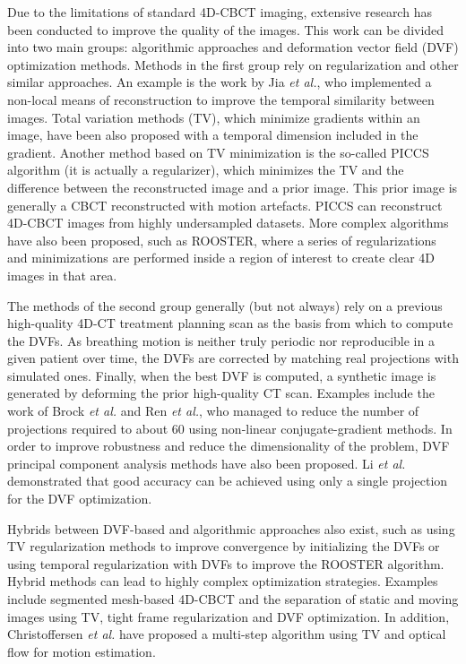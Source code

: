 Due to the limitations of standard 4D-CBCT imaging, extensive research has been conducted to improve the quality of the images.  This work can be divided into two main groups: algorithmic approaches and deformation vector field (DVF) optimization methods.  Methods in the first group rely on regularization and other similar approaches.  An example is the work by Jia \textit{et al.}\cite{jia2012}, who implemented a non-local means of reconstruction to improve the temporal similarity between images.  Total variation methods (TV)\cite{ASD_POCS}, which minimize gradients within an image, have been also proposed with a temporal dimension included in the gradient\cite{0031-9155-57-6-1517}.  Another method based on TV minimization is the so-called PICCS algorithm\cite{chen2008prior}\cite{0031-9155-53-20-006}\cite{chen2012time} (it is actually a regularizer), which minimizes the TV and the difference between the reconstructed image and a prior image.  This prior image is generally a CBCT reconstructed with motion artefacts.  PICCS can reconstruct 4D-CBCT images from highly undersampled datasets.  More complex algorithms have also been proposed, such as ROOSTER\cite{:/content/aapm/journal/medphys/41/2/10.1118/1.4860215}, where a series of regularizations and minimizations are performed inside a region of interest to create clear 4D images in that area.

The methods of the second group generally (but not always) rely on a previous high-quality 4D-CT treatment planning scan as the basis from which to compute the DVFs.  As breathing motion is neither truly periodic nor reproducible in a given patient over time, the DVFs are corrected by matching real projections with simulated ones.  Finally, when the best DVF is computed, a synthetic image is generated by deforming the prior high-quality CT scan.  Examples include the work of Brock \textit{et al.}\cite{brock2010} and Ren \textit{et al.}\cite{Ren20121584}, who managed to reduce the number of projections required to about 60 using non-linear conjugate-gradient methods.  In order to improve robustness and reduce the dimensionality of the problem, DVF principal component analysis methods have also been proposed\cite{zhang2010correction}.  Li \textit{et al.}\cite{:/content/aapm/journal/medphys/37/6/10.1118/1.3426002}\cite{:/content/aapm/journal/medphys/38/5/10.1118/1.3582693} demonstrated that good accuracy can be achieved using only a single projection for the DVF optimization.

Hybrids between DVF-based and algorithmic approaches also exist, such as using TV regularization methods to improve convergence by initializing the DVFs\cite{wang2012high} or using temporal regularization with DVFs to improve the ROOSTER algorithm\cite{mory2016motion}.  Hybrid methods can lead to highly complex optimization strategies.  Examples include segmented mesh-based 4D-CBCT\cite{0031-9155-61-3-996} and the separation of static and moving images using TV, tight frame regularization and DVF optimization\cite{0031-9155-56-11-002}.  In addition, Christoffersen \textit{et al.}\cite{christoffersen2013registration} have proposed a multi-step algorithm using TV and optical flow for motion estimation.

